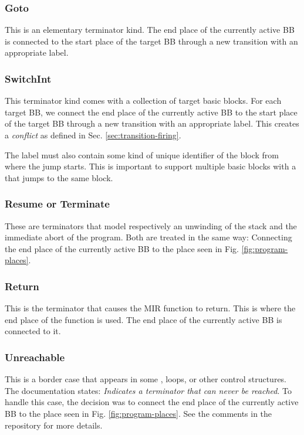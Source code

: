 \subsubsection{Goto}

This is an elementary terminator kind.
The end place of the currently active \acrshort{BB} is connected
to the start place of the target \acrshort{BB}
through a new transition with an appropriate label.

\subsubsection{SwitchInt}

This terminator kind comes with a collection of target basic blocks.
For each target \acrshort{BB},
we connect the end place of the currently active \acrshort{BB}
to the start place of the target \acrshort{BB}
through a new transition with an appropriate label.
This creates a \emph{conflict} as defined in Sec. \ref{sec:transition-firing}.

The label must also contain some kind of unique identifier of the block from where the
jump starts.
This is important to support multiple basic blocks with a 
that jumps to the same block.

\subsubsection{Resume or Terminate}

These are terminators that model respectively an unwinding of the stack
and the immediate abort of the program.
Both are treated in the same way:
Connecting the end place of the currently active \acrshort{BB}
to the  place seen in Fig. \ref{fig:program-places}.

\subsubsection{Return}

This is the terminator that causes the \acrshort{MIR} function to return.
This is where the end place of the function is used.
The end place of the currently active \acrshort{BB} is connected to it.

\subsubsection{Unreachable}

This is a border case that appears
in some ,  loops, or other control structures.
The documentation states: \emph{Indicates a terminator that can never be reached}.
To handle this case, the decision was to connect
the end place of the currently active \acrshort{BB}
to the  place seen in Fig. \ref{fig:program-places}.
See the comments in the repository for more details.

